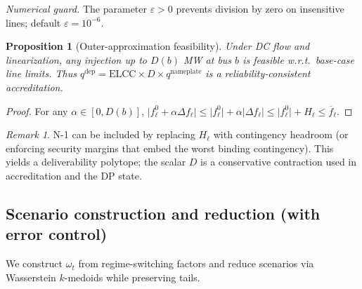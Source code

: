 \documentclass[11pt]{article}
\numberwithin{equation}{section}
\newtheorem{proposition}{Proposition}[section]
\theoremstyle{definition}
\theoremstyle{remark}
\newtheorem{remark}{Remark}[section]
\begin{document}
\noindent\emph{Numerical guard.} The parameter $\varepsilon>0$ prevents division by zero on insensitive lines; default $\varepsilon=10^{-6}$.

\begin{proposition}[Outer-approximation feasibility]\label{prop:D_outer}
Under DC flow and linearization, any injection up to $D(b)$ MW at bus $b$ is feasible w.r.t.\ base-case line limits. Thus $q^{\mathrm{dep}}=\mathrm{ELCC}\times D \times q^{\mathrm{nameplate}}$ is a reliability-consistent accreditation.
\end{proposition}

\begin{proof}
For any $\alpha\in[0,D(b)]$, $\lvert f^0_\ell + \alpha \Delta f_\ell\rvert\le \lvert f^0_\ell\rvert + \alpha \lvert\Delta f_\ell\rvert \le \lvert f^0_\ell\rvert + H_\ell \le \overline f_\ell$.
\end{proof}

\begin{remark}
N-1 can be included by replacing $H_\ell$ with contingency headroom (or enforcing security margins that embed the worst binding contingency). This yields a deliverability polytope; the scalar $D$ is a conservative contraction used in accreditation and the DP state.
\end{remark}

\subsection{Scenario construction and reduction (with error control)}
\label{sec:annexF_scenarios}

We construct $\omega_t$ from regime-switching factors and reduce scenarios via Wasserstein $k$-medoids while preserving tails.
\end{document}

